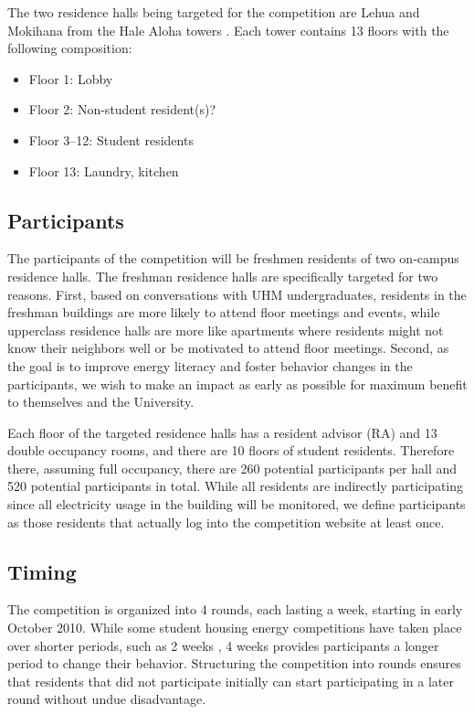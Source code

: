 The two residence halls being targeted for the competition are Lehua and Mokihana from the Hale Aloha towers \cite{hale-aloha-website}. Each tower contains 13 floors with the following composition:

\begin{itemize}
	\item Floor 1: Lobby
	\item Floor 2: Non-student resident(s)?
	\item Floor 3--12: Student residents
	\item Floor 13: Laundry, kitchen
\end{itemize}

\subsection{Participants}

The participants of the competition will be freshmen residents of two on-campus residence halls. The freshman residence halls are specifically targeted for two reasons. First, based on conversations with UHM undergraduates, residents in the freshman buildings are more likely to attend floor meetings and events, while upperclass residence halls are more like apartments where residents might not know their neighbors well or be motivated to attend floor meetings. Second, as the goal is to improve energy literacy and foster behavior changes in the participants, we wish to make an impact as early as possible for maximum benefit to themselves and the University.

Each floor of the targeted residence halls has a resident advisor (RA) and 13 double occupancy rooms, and there are 10 floors of student residents. Therefore there, assuming full occupancy, there are 260 potential participants per hall and 520 potential participants in total. While all residents are indirectly participating since all electricity usage in the building will be monitored, we define participants as those residents that actually log into the competition website at least once.

\subsection{Timing}

The competition is organized into 4 rounds, each lasting a week, starting in early October 2010. While some student housing energy competitions have taken place over shorter periods, such as 2 weeks \cite{petersen-dorm-energy-reduction}, 4 weeks provides participants a longer period to change their behavior. Structuring the competition into rounds ensures that residents that did not participate initially can start participating in a later round without undue disadvantage.

